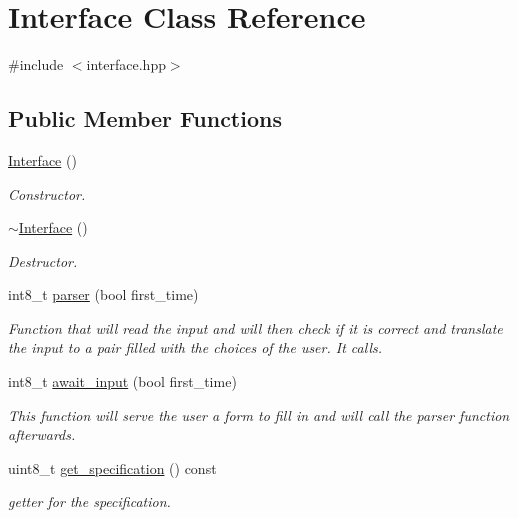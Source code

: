 \hypertarget{class_interface}{}\section{Interface Class Reference}
\label{class_interface}


{\ttfamily \#include $<$interface.\+hpp$>$}

\subsection*{Public Member Functions}
\begin{DoxyCompactItemize}
\item 
\hyperlink{class_interface_a4406d74c75bdfe150bf72be1f1cda8b1}{Interface} ()
\begin{DoxyCompactList}\small\item\em Constructor. \end{DoxyCompactList}\item 
\hyperlink{class_interface_a19179888f29f18f1be54a3dfe98f68c0}{$\sim$\+Interface} ()
\begin{DoxyCompactList}\small\item\em Destructor. \end{DoxyCompactList}\item 
int8\+\_\+t \hyperlink{class_interface_a345faa7570aa36a31681ca850d1c283d}{parser} (bool first\+\_\+time)
\begin{DoxyCompactList}\small\item\em Function that will read the input and will then check if it is correct and translate the input to a pair filled with the choices of the user. It calls. \end{DoxyCompactList}\item 
int8\+\_\+t \hyperlink{class_interface_a24b944dc66cb79f76ba91192a2a2860e}{await\+\_\+input} (bool first\+\_\+time)
\begin{DoxyCompactList}\small\item\em This function will serve the user a form to fill in and will call the parser function afterwards. \end{DoxyCompactList}\item 
uint8\+\_\+t \hyperlink{class_interface_adfa71e85801e5bb0e8bc88da902f8133}{get\+\_\+specification} () const 
\begin{DoxyCompactList}\small\item\em getter for the specification. \end{DoxyCompactList}\end{DoxyCompactItemize}


